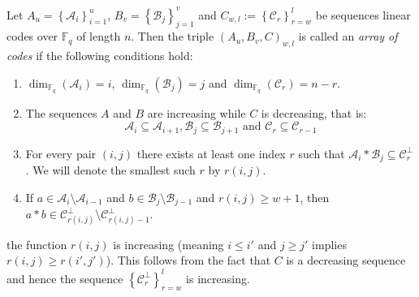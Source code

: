 \begin{definition}
  Let $A_{u} = \left\{\mathcal{A}_i\right\}_{i = 1}^{u}$, $B_{v} = \left\{\mathcal{B}_j\right\}_{j = 1}^{v}$ and $C_{w,l} := \left\{\mathcal{C}_r\right\}_{r = w}^l$ be sequences linear codes over $\mathbb{F}_q$ of length $n$. Then the triple $(A_{u}, B_v, C)_{w, l}$ is called an \textit{array of codes} if the following conditions hold:
  \begin{enumerate}[label=(ECA\arabic*), leftmargin=*]
    \item $\dim_{\mathbb{F}_q}(\mathcal{A}_i) = i$, $\dim_{\mathbb{F}_q}(\mathcal{B}_j) = j$ and $\dim_{\mathbb{F}_q}(\mathcal{C}_r) = n - r$. \label{ECA1}
    \item The sequences $A$ and $B$ are increasing while $C$ is decreasing, that is: \label{ECA2}
          \begin{equation*}
            \mathcal{A}_i \subseteq \mathcal{A}_{i + 1}, \mathcal{B}_j \subseteq \mathcal{B}_{j + 1} \text{ and } \mathcal{C}_{r} \subseteq \mathcal{C}_{r - 1}
          \end{equation*}
    \item For every pair $(i, j)$ there exists at least one index $r$ such that $\mathcal{A}_{i} * \mathcal{B}_j \subseteq \mathcal{C}_r^{\perp}$. We will denote the smallest such $r$ by $r(i, j)$.\label{ECA3}
    \item If $a \in \mathcal{A}_i \setminus \mathcal{A}_{i - 1}$ and $b \in \mathcal{B}_j \setminus \mathcal{B}_{j - 1}$ and $r(i, j) \geq w + 1$, then $a * b \in \mathcal{C}_{r(i, j)}^{\perp} \setminus \mathcal{C}_{r(i,j) - 1}^{\perp}$. \label{ECA4}
  \end{enumerate}
\end{definition}
\begin{remark}\label{rem:r_is_increasing}
  the function $r(i, j)$ is increasing (meaning $i \leq i'$ and $j \geq j'$ implies $r(i, j) \geq r(i', j')$). This follows from the fact that $C$ is a decreasing sequence and hence the sequence $\left\{\mathcal{C}^{\perp}_{r}\right\}_{r = w}^{l}$ is increasing.
\end{remark}

